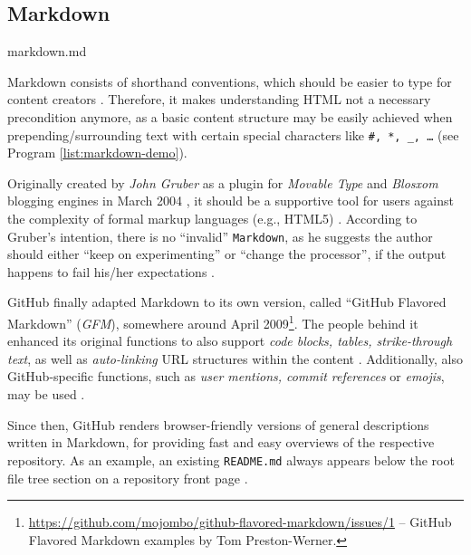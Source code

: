 \subsection{Markdown}
\label{sec:buildpipelines-markdown}

\begin{program}
  \caption{markdown.md}
  \label{list:markdown-demo}

\end{program}

Markdown consists of shorthand conventions, which should be easier to type for content creators  \cite[38]{dhillon2016}.
Therefore, it makes understanding HTML not a necessary precondition anymore, as a basic content structure may be easily achieved when prepending/surrounding text with certain special characters like \texttt{\#, *, \_, \ldots} (see Program \ref{list:markdown-demo}).

Originally created by \emph{John Gruber} as a plugin for \emph{Movable Type} and \emph{Blosxom} blogging engines in March 2004 \cite{Markdown2004introduction}\cite{Markdown2004main}, it should be a supportive tool for users against the complexity of formal markup languages (e.g., HTML5) \cite[4]{RFC7764}. According to Gruber's intention, there is no ``invalid'' \texttt{Markdown}, as he suggests the author should either ``keep on experimenting'' or ``change the processor'', if the output happens to fail his/her expectations \cite[5]{RFC7764}.

GitHub finally adapted Markdown to its own version, called ``GitHub Flavored Markdown'' (\emph{GFM}), somewhere around April 2009\footnote{\url{https://github.com/mojombo/github-flavored-markdown/issues/1} -- GitHub Flavored Markdown examples by Tom Preston-Werner.}. The people behind it enhanced its original functions to also support \emph{code blocks, tables, strike-through text}, as well as \emph{auto-linking} URL structures within the content \cite[18]{RFC7764}. Additionally, also GitHub-specific functions, such as \emph{user mentions, commit references} or \emph{emojis}, may be used \cite{GithubFlavoredMarkdown}.

Since then, GitHub renders browser-friendly versions of general descriptions written in Markdown, for providing fast and easy overviews of the respective repository. As an example, an existing \texttt{README.md} always appears below the root file tree section on a repository front page \cite[5]{gandrud2013github}.
